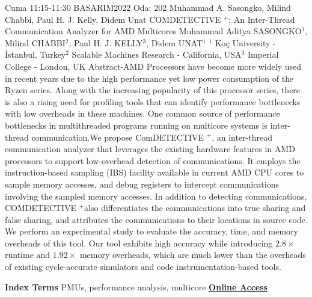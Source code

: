 
    \begin{abstract_basarim}
    {Cuma 11:15-11:30}
    {BASARIM2022}
    {Oda: 202}
    {Muhammad A. Sasongko, Milind Chabbi, Paul H. J. Kelly, Didem Unat}
    {COMDETECTIVE $^{+}$: An Inter-Thread Communication Analyzer for AMD Multicores}
    {%
    Muhammad Aditya SASONGKO$^{1}$, Milind CHABBI$^{2}$, Paul H. J. KELLY$^{3}$, Didem UNAT$^{1}$}
    {%
    }
    {%
    $^1$ Koç University - İstanbul, Turkey\newline{}$^2$ Scalable Machines Research - California, USA\newline{}$^3$ Imperial College - London, UK}
    Abstract-AMD Processors have become more widely used in recent years due to the high performance yet low power consumption of the Ryzen series. Along with the increasing popularity of this processor series, there is also a rising need for profiling tools that can identify performance bottlenecks with low overheads in these machines. One common source of performance bottlenecks in multithreaded programs running on multicore systems is inter-thread communication.\newline We propose ComDETECTIVE ${ }^{+}$, an inter-thread communication analyzer that leverages the existing hardware features in AMD processors to support low-overhead detection of communications. It employs the instruction-based sampling (IBS) facility available in current AMD CPU cores to sample memory accesses, and debug registers to intercept communications involving the sampled memory accesses. In addition to detecting communications, COMDETECTIVE ${ }^{+}$also differentiates the communications into true sharing and false sharing, and attributes the communications to their locations in source code. We perform an experimental study to evaluate the accuracy, time, and memory overheads of this tool. Our tool exhibits high accuracy while introducing $2.8 \times$ runtime and $1.92 \times$ memory overheads, which are much lower than the overheads of existing cycle-accurate simulators and code instrumentation-based tools. 
    
            \textbf{Index Terms} \newline{}PMUs, performance analysis, multicore
     \newline\newline\noindent \href{https://drive.google.com/file/d/1pJcsXDiNB8L19W3ldZKr6VvdV5SFgjIs/view?usp=drivesdk}{\bfseries Online Access}
    \end{abstract_basarim}
    